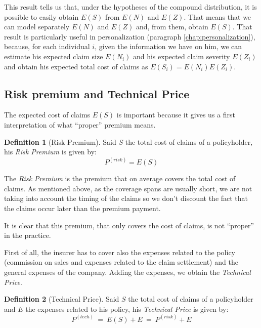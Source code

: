 \documentclass[a4paper, twoside, openright, 12pt]{report}
\theoremstyle{definition}
\newtheorem{definition}{Definition}[chapter]
\theoremstyle{definition}
\theoremstyle{definition}
\theoremstyle{remark}
\begin{document}
This result tells us that, under the hypotheses of the compound distribution, it is possible to easily obtain \(E(S)\) from \(E(N)\) and \(E(Z)\). That means that we can model separately \(E(N)\) and \(E(Z)\) and, from them, obtain \(E(S)\). That result is particularly useful in personalization (paragraph \ref{chap:personalization}), because, for each individual \(i\), given the information we have on him, we can estimate his expected claim size \(E(N_i)\) and his expected claim severity \(E(Z_i)\) and obtain his expected total cost of claims as \(E(S_i) = E(N_i) E(Z_i)\).

\hypertarget{chap:risk-prem-tech-price}{%
\subsection{Risk premium and Technical Price}\label{chap:risk-prem-tech-price}}

The expected cost of claims \(E(S)\) is important because it gives us a first interpretation of what ``proper'' premium means.

\begin{definition}[Risk Premium]
\label{def:risk-premium} \iffalse (Risk Premium) \fi{} Said \(S\) the total cost of claims of a policyholder, his \emph{Risk Premium} is given by:
\[
P^{(risk)} = E(S)
\]
\end{definition}

The \emph{Risk Premium} is the premium that on average covers the total cost of claims. As mentioned above, as the coverage spans are usually short, we are not taking into account the timing of the claims so we don't discount the fact that the claims occur later than the premium payment.

It is clear that this premium, that only covers the cost of claims, is not ``proper'' in the practice.

First of all, the insurer has to cover also the expenses related to the policy (commission on sales and expenses related to the claim settlement) and the general expenses of the company. Adding the expenses, we obtain the \emph{Technical Price}.

\begin{definition}[Technical Price]
\label{def:technical-price} \iffalse (Technical Price) \fi{} Said \(S\) the total cost of claims of a policyholder and \(E\) the expenses related to his policy, his \emph{Technical Price} is given by:
\[
P^{(tech)} \ = \ E(S) + E \ = \ P^{(risk)} + E
\]
\end{definition}
\end{document}

